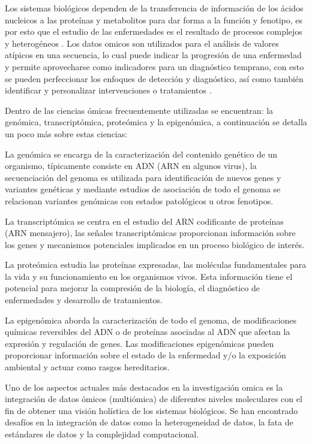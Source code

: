 Los sistemas biológicos dependen de la transferencia de información de los ácidos nucleicos a las proteínas y metabolitos para dar forma a la función y fenotipo, es por esto que el estudio de las enfermedades es el resultado de procesos complejos y heterogéneos \citep{kim2018data}. Los datos omicos son utilizados para el análisis de valores atípicos en una secuencia, lo cual puede indicar la progresión de una enfermedad y permite aprovecharse como indicadores para un diagnóstico temprano, con esto se pueden perfeccionar los enfoques de detección y diagnóstico, así como también identificar y personalizar intervenciones o tratamientos \citep{krassowski2020state}.

Dentro de las ciencias ómicas frecuentemente utilizadas se encuentran: la genómica, transcriptómica, proteómica y la epigenómica, a continuación se detalla un poco más sobre estas ciencias:

La genómica se encarga de la caracterización del contenido genético de un organismo, típicamente consiste en ADN (ARN en algunos virus), la secuenciación del genoma es utilizada para identificación de nuevos genes y variantes genéticas y mediante estudios de asociación de todo el genoma se relacionan variantes genómicas con estados patológicos u otros fenotipos.

La transcriptómica se centra en el estudio del ARN codificante de proteínas (ARN mensajero), las señales transcriptómicas proporcionan información sobre los genes y mecanismos potenciales implicados en un proceso biológico de interés.

La proteómica estudia las proteínas expresadas, las moléculas fundamentales para la vida y su funcionamiento en los organismos vivos. Esta información tiene el potencial para mejorar la compresión de la biología, el diagnóstico de enfermedades y desarrollo de tratamientos.

La epigenómica aborda la caracterización de todo el genoma, de modificaciones químicas reversibles del ADN o de proteínas asociadas al ADN que afectan la expresión y regulación de genes. Las modificaciones epigenómicas pueden proporcionar información sobre el estado de la enfermedad y/o la exposición ambiental y actuar como rasgos hereditarios.

Uno de los aspectos actuales más destacados en la investigación omica es la integración de datos ómicos (multiómica) de diferentes niveles moleculares con el fin de obtener una visión holística de los sistemas biológicos. Se han encontrado desafíos en la integración de datos como la heterogeneidad de datos, la fata de estándares de datos y la complejidad computacional.

